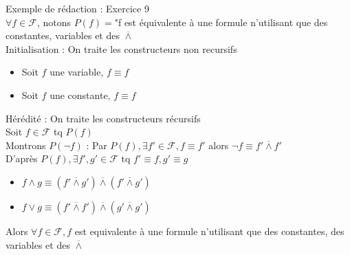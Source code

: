 \begin{ex} Exemple de rédaction : Exercice 9 \\
    $\forall f \in \mathcal{F}$, notons $P(f)=$"f est équivalente à une formule n'utilisant que des constantes, variables et des $\overline{\land}$ \\
    
    Initialisation : On traite les constructeurs non recursifs\\
        \begin{itemize}
            \item Soit $f$ une variable, $f \equiv f$
            \item Soit $f$ une constante, $f\equiv f$
        \end{itemize}
    \newline
    Hérédité : On traite les constructeurs récursifs\\
    \newline
        Soit $f \in \mathcal{F}$ tq $P(f)$ \\
        
        Montrons $P(\lnot f)$ : Par $P(f), \exists f' \in \mathcal{F}, f\equiv f'$ alors $\lnot f \equiv f' \overline{\land} f'$ \\
        \newline
        D'après $P(f),\exists f',g' \in \mathcal{F} \text{ tq } f'\equiv f, g'\equiv g$\\
        \begin{itemize}
            \item $f \land g \equiv (f' \overline{\land} g')\overline{\land}(f' \overline{\land} g')$
            \item $f \lor g \equiv (f' \overline{\land} f')\overline{\land}(g' \overline{\land} g')$
        \end{itemize}

Alors  $\forall f \in \mathcal F, f$ est equivalente à une formule n'utilisant que des constantes, des variables et des $\overline{\land}$

\end{ex}

    

